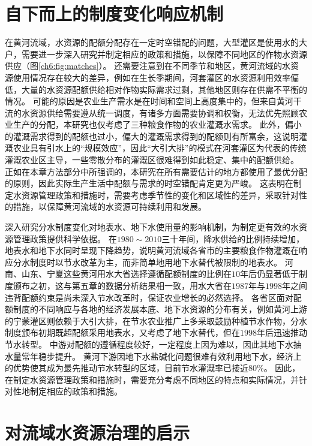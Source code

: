 \section{自下而上的制度变化响应机制}

在黄河流域，水资源的配额分配存在一定时空错配的问题，大型灌区是使用水的大户，需要进一步深入研究并制定相应的政策和措施，以保障不同地区的作物水资源供应（图\ref{ch6:fig:matches}）。
还需要注意到在不同季节和地区，黄河流域的水资源使用情况存在较大的差异，例如在生长季期间，河套灌区的水资源利用效率偏低，大量的水资源配额供给相对作物实际需求过剩，其他地区则存在供需不平衡的情况。
可能的原因是农业生产需水是在时间和空间上高度集中的，但来自黄河干流的水资源供给需要遵从统一调度，有诸多方面需要协调和权衡，无法优先照顾农业生产的分配，本研究也仅考虑了三种粮食作物的农业灌溉水需求。
此外，偏小的灌溉需求得到的配额也过小，偏大的灌溉需求得到的配额则有所富余，这说明灌溉农业具有引水上的“规模效应”，因此“大引大排”的模式在河套灌区为代表的传统灌溉农业区主导，一些零散分布的灌溉区很难得到如此稳定、集中的配额供给。
正如在本章方法部分中所强调的，本研究在所有需要估计的地方都使用了最优分配的原则，因此实际生产生活中配额与需求的时空错配肯定更为严峻。
这表明在制定水资源管理政策和措施时，需要考虑季节性的变化和区域性的差异，采取针对性的措施，以保障黄河流域的水资源可持续利用和发展。

深入研究分水制度变化对地表水、地下水使用量的影响机制，为制定更有效的水资源管理政策提供科学依据。
在$1980 \sim 2010$三十年间，降水供给的比例持续增加，地表水和地下水同时呈现下降趋势，说明黄河流域各省市的主要粮食作物灌溉在响应分水制度时以节水改革为主，而非简单地用地下水替代被限制的地表水。
河南、山东、宁夏这些黄河用水大省选择遵循配额制度的比例在$10$年后仍显著低于制度颁布之初，这与第五章的数据分析结果相一致，用水大省在$1987$年与$1998$年之间违背配额约束是尚未深入节水改革时，保证农业增长的必然选择。
各省区面对配额制度的不同响应与各地的经济发展本底、地下水资源的分布有关，例如黄河上游的宁蒙灌区则依赖于大引大排，在节水农业推广上多采取鼓励种植节水作物，分水制度颁布初期既超配额采用地表水，又考虑了地下水替代，但在$1998$年后迅速推动节水转型。
中游对配额的遵循程度较好，一定程度上因为难以，因此其地下水抽水量常年稳步提升。
黄河下游因地下水盐碱化问题很难有效利用地下水，经济上的优势使其成为最先推动节水转型的区域，目前节水灌溉率已接近$80\%$。
因此，在制定水资源管理政策和措施时，需要充分考虑不同地区的特点和实际情况，并针对性地制定相应的政策和措施。

\section{对流域水资源治理的启示}

